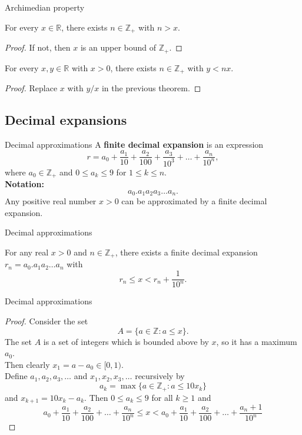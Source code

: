 \documentclass{beamer}
\begin{document}
\begin{frame}{Archimedian property}
\begin{thm}
For every $x\in\mathbb{R}$, there exists $n\in\mathbb{Z}_+$ with $n>x$.
\end{thm}
\pause
\begin{proof}
If not, then $x$ is an upper bound of $\mathbb{Z}_+$.
\end{proof}
\pause
\begin{thm}
For every $x,y\in\mathbb{R}$ with $x>0$, there exists $n\in\mathbb{Z}_+$ with $y<nx$.
\end{thm}
\pause
\begin{proof}
Replace $x$ with $y/x$ in the previous theorem.
\end{proof}
\end{frame}

\subsection{Decimal expansions}

\begin{frame}{Decimal approximations}
A \textbf{finite decimal expansion} is an expression
$$r = a_0 + \frac{a_1}{10} + \frac{a_2}{100} + \frac{a_3}{10^3} + \dots + \frac{a_n}{10^n},$$
where $a_0\in\mathbb Z_+$ and $0\leq a_k\leq 9$ for $1\leq k\leq n$.\\
\pause
\textbf{Notation:}
$$a_0.a_1a_2a_3\dots a_n.$$
\pause
Any positive real number $x>0$ can be approximated by a finite decimal expansion.
\end{frame}

\begin{frame}{Decimal approximations}
\begin{thm}
For any real $x > 0$ and $n\in \mathbb{Z}_+$, there exists a finite decimal expansion $r_n=a_0.a_1a_2\dots a_n$ with
$$r_n \leq x < r_n + \frac{1}{10^n}.$$
\end{thm}
\end{frame}

\begin{frame}{Decimal approximations}
\begin{proof}
Consider the set
$$A = \{a\in\mathbb{Z}: a\leq x\}.$$
\pause
The set $A$ is a set of integers which is bounded above by $x$, so it has a maximum $a_0$. \\
\pause
Then clearly $x_1 = a-a_0\in [0,1)$. \\
\pause
Define $a_1,a_2,a_3,\dots$ and $x_1,x_2,x_3,\dots$ recursively by
$$a_k = \max\{a\in\mathbb{Z}_+: a\leq 10x_{k}\}$$
and $x_{k+1}=10x_k-a_k$.
\pause
Then $0\leq a_k \leq 9$ for all $k\geq 1$ 
\pause
and 
$$a_0 + \frac{a_1}{10} + \frac{a_2}{100} + \dots + \frac{a_n}{10^n}
\leq x < a_0 + \frac{a_1}{10} + \frac{a_2}{100} + \dots + \frac{a_n+1}{10^n}
$$
\end{proof}
\end{frame}
\end{document}

